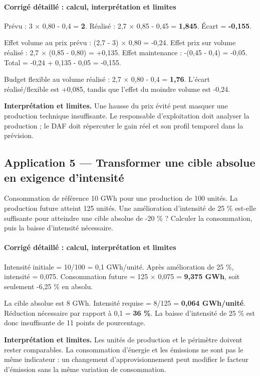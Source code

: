 \documentclass[12pt,a4paper]{article}
\begin{document}
\paragraph{Corrigé détaillé : calcul, interprétation et limites}
Prévu : 3 $\times$ 0,80 - 0,4 = \textbf{2}. Réalisé : 2,7 $\times$ 0,85 - 0,45 = \textbf{1,845}. Écart = \textbf{-0,155}.

Effet volume au prix prévu : (2,7 - 3) $\times$ 0,80 = -0,24. Effet prix sur volume réalisé : 2,7 $\times$ (0,85 - 0,80) = +0,135. Effet maintenance : -(0,45 - 0,4) = -0,05. Total = -0,24 + 0,135 - 0,05 = -0,155.

Budget flexible au volume réalisé : 2,7 $\times$ 0,80 - 0,4 = \textbf{1,76}. L’écart réalisé/flexible est +0,085, tandis que l’effet du moindre volume est -0,24.

\textbf{Interprétation et limites.} Une hausse du prix évité peut masquer une production technique insuffisante. Le responsable d’exploitation doit analyser la production ; le DAF doit répercuter le gain réel et son profil temporel dans la prévision.


\subsection*{Application 5 --- Transformer une cible absolue en exigence d’intensité}
Consommation de référence 10 GWh pour une production de 100 unités. La production future atteint 125 unités. Une amélioration d’intensité de 25 \% est-elle suffisante pour atteindre une cible absolue de -20 \% ? Calculer la consommation, puis la baisse d’intensité nécessaire.


\paragraph{Corrigé détaillé : calcul, interprétation et limites}
Intensité initiale = 10/100 = 0,1 GWh/unité. Après amélioration de 25 \%, intensité = 0,075. Consommation future = 125 $\times$ 0,075 = \textbf{9,375 GWh}, soit seulement -6,25 \% en absolu.

La cible absolue est 8 GWh. Intensité requise = 8/125 = \textbf{0,064 GWh/unité}. Réduction nécessaire par rapport à 0,1 = \textbf{36 \%}. La baisse d’intensité de 25 \% est donc insuffisante de 11 points de pourcentage.

\textbf{Interprétation et limites.} Les unités de production et le périmètre doivent rester comparables. La consommation d’énergie et les émissions ne sont pas le même indicateur : un changement d’approvisionnement peut modifier le facteur d’émission sans la même variation de consommation.
\end{document}

